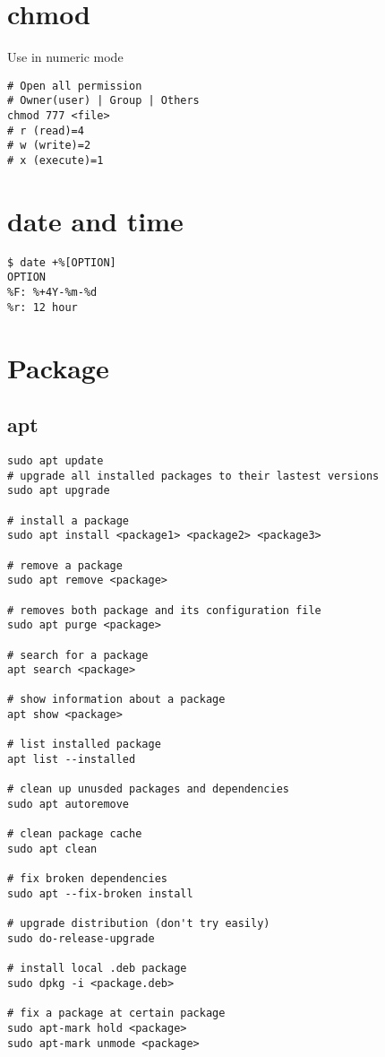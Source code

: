 \documentclass[12pt,a4paper]{article}
\begin{document}
\section{chmod}
Use in numeric mode
\begin{footnotesize}
\begin{verbatim}
# Open all permission
# Owner(user) | Group | Others
chmod 777 <file>
# r (read)=4
# w (write)=2
# x (execute)=1
\end{verbatim}
\end{footnotesize}

\section{date and time}
\begin{footnotesize}
\begin{verbatim}
$ date +%[OPTION]
OPTION
%F: %+4Y-%m-%d
%r: 12 hour
\end{verbatim}
\end{footnotesize}

\section{Package}
\subsection{apt}
\begin{footnotesize}
\begin{verbatim}
sudo apt update
# upgrade all installed packages to their lastest versions
sudo apt upgrade

# install a package
sudo apt install <package1> <package2> <package3>

# remove a package
sudo apt remove <package>

# removes both package and its configuration file
sudo apt purge <package>

# search for a package
apt search <package>

# show information about a package
apt show <package>

# list installed package
apt list --installed

# clean up unusded packages and dependencies
sudo apt autoremove

# clean package cache
sudo apt clean

# fix broken dependencies
sudo apt --fix-broken install 

# upgrade distribution (don't try easily)
sudo do-release-upgrade

# install local .deb package
sudo dpkg -i <package.deb>

# fix a package at certain package
sudo apt-mark hold <package>
sudo apt-mark unmode <package>
\end{verbatim}
\end{footnotesize}
\end{document}
